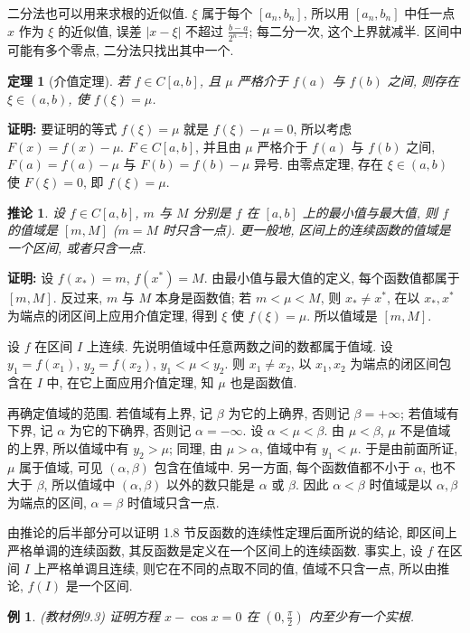 \documentclass[UTF8,openany]{ctexbook}
\theoremstyle{chinesetextbook}
\newtheorem{example}{例}[section]
\newtheorem{theorem}{定理}[section]
\newenvironment{cnproof}{\par\indent\textbf{证明:} \ignorespaces}{\par}
\newtheorem*{corollarysingle}{推论}
\begin{document}
二分法也可以用来求根的近似值. $\xi$ 属于每个 $[a_n,b_n]$, 所以用 $[a_n,b_n]$ 中任一点 $x$ 作为 $\xi$ 的近似值, 误差 $|x-\xi|$ 不超过 $\displaystyle\frac{b-a}{2^{n-1}}$; 每二分一次, 这个上界就减半. 区间中可能有多个零点, 二分法只找出其中一个.
\begin{theorem}[介值定理]
若 $f\in C[a,b]$, 且 $\mu$ 严格介于 $f(a)$ 与 $f(b)$ 之间, 则存在 $\xi\in(a,b)$, 使 $f(\xi)=\mu$.
\end{theorem}
\begin{cnproof}
要证明的等式 $f(\xi)=\mu$ 就是 $f(\xi)-\mu=0$, 所以考虑 $F(x)=f(x)-\mu$. $F\in C[a,b]$, 并且由 $\mu$ 严格介于 $f(a)$ 与 $f(b)$ 之间, $F(a)=f(a)-\mu$ 与 $F(b)=f(b)-\mu$ 异号. 由零点定理, 存在 $\xi\in(a,b)$ 使 $F(\xi)=0$, 即 $f(\xi)=\mu$.
\end{cnproof}
\begin{corollarysingle}
设 $f\in C[a,b]$, $m$ 与 $M$ 分别是 $f$ 在 $[a,b]$ 上的最小值与最大值, 则 $f$ 的值域是 $[m,M]$ ($m=M$ 时只含一点). 更一般地, 区间上的连续函数的值域是一个区间, 或者只含一点.
\end{corollarysingle}
\begin{cnproof}
设 $f(x_*)=m$, $f(x^*)=M$. 由最小值与最大值的定义, 每个函数值都属于 $[m,M]$. 反过来, $m$ 与 $M$ 本身是函数值; 若 $m<\mu<M$, 则 $x_*\ne x^*$, 在以 $x_*,x^*$ 为端点的闭区间上应用介值定理, 得到 $\xi$ 使 $f(\xi)=\mu$. 所以值域是 $[m,M]$.

设 $f$ 在区间 $I$ 上连续. 先说明值域中任意两数之间的数都属于值域. 设 $y_1=f(x_1)$, $y_2=f(x_2)$, $y_1<\mu<y_2$. 则 $x_1\ne x_2$, 以 $x_1,x_2$ 为端点的闭区间包含在 $I$ 中, 在它上面应用介值定理, 知 $\mu$ 也是函数值.

再确定值域的范围. 若值域有上界, 记 $\beta$ 为它的上确界, 否则记 $\beta=+\infty$; 若值域有下界, 记 $\alpha$ 为它的下确界, 否则记 $\alpha=-\infty$. 设 $\alpha<\mu<\beta$. 由 $\mu<\beta$, $\mu$ 不是值域的上界, 所以值域中有 $y_2>\mu$; 同理, 由 $\mu>\alpha$, 值域中有 $y_1<\mu$. 于是由前面所证, $\mu$ 属于值域, 可见 $(\alpha,\beta)$ 包含在值域中. 另一方面, 每个函数值都不小于 $\alpha$, 也不大于 $\beta$, 所以值域中 $(\alpha,\beta)$ 以外的数只能是 $\alpha$ 或 $\beta$. 因此 $\alpha<\beta$ 时值域是以 $\alpha,\beta$ 为端点的区间, $\alpha=\beta$ 时值域只含一点.
\end{cnproof}
由推论的后半部分可以证明 1.8 节反函数的连续性定理后面所说的结论, 即区间上严格单调的连续函数, 其反函数是定义在一个区间上的连续函数. 事实上, 设 $f$ 在区间 $I$ 上严格单调且连续, 则它在不同的点取不同的值, 值域不只含一点, 所以由推论, $f(I)$ 是一个区间.
\begin{example}
\textnormal{(教材例9.3)} 证明方程 $x-\cos x=0$ 在 $\displaystyle\left(0,\frac\pi2\right)$ 内至少有一个实根.
\end{example}
\end{document}
